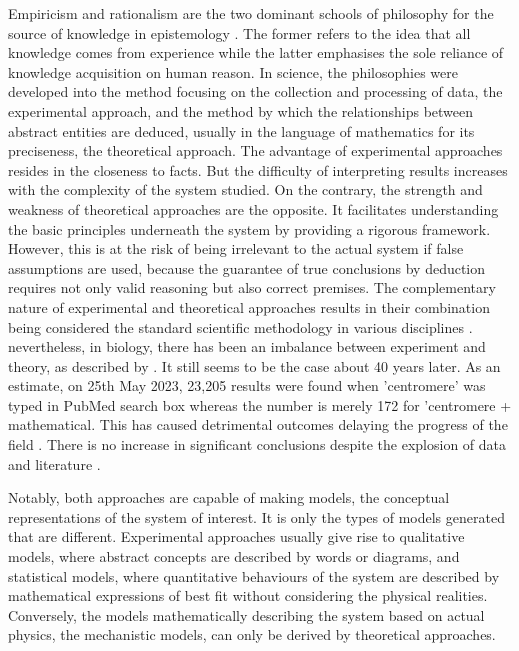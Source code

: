 Empiricism and rationalism are the two dominant schools of philosophy for the source of knowledge in epistemology \citep{Solomon2006ThePhilosophy}. The former refers to the idea that all knowledge comes from experience while the latter emphasises the sole reliance of knowledge acquisition on human reason. In science, the philosophies were developed into the method focusing on the collection and processing of data, the experimental approach, and the method by which the relationships between abstract entities are deduced, usually in the language of mathematics for its preciseness, the theoretical approach. The advantage of experimental approaches resides in the closeness to facts. But the difficulty of interpreting results increases with the complexity of the system studied. On the contrary, the strength and weakness of theoretical approaches are the opposite. It facilitates understanding the basic principles underneath the system by providing a rigorous framework. However, this is at the risk of being irrelevant to the actual system if false assumptions are used, because the guarantee of true conclusions by deduction requires not only valid reasoning but also correct premises. The complementary nature of experimental and theoretical approaches results in their combination being considered the standard scientific methodology in various disciplines \citep{Platt1964StrongInference}. nevertheless, in biology, there has been an imbalance between experiment and theory, as described by  \cite{Fidelman1985TheModeling}. It still seems to be the case about 40 years later. As an estimate, on 25th May 2023, 23,205 results were found when 'centromere' was typed in PubMed search box whereas the number is merely 172 for 'centromere + mathematical. This has caused detrimental outcomes delaying the progress of the field \citep{Fidelman1985TheModeling}. There is no increase in significant conclusions despite the explosion of data and literature \citep{Park2023PapersTime, Nurse2021BiologyData}. 

Notably, both approaches are capable of making models, the conceptual representations of the system of interest. It is only the types of models generated that are different. Experimental approaches usually give rise to qualitative models, where abstract concepts are described by words or diagrams, and statistical models, where quantitative behaviours of the system are described by mathematical expressions of best fit without considering the physical realities. Conversely, the models mathematically describing the system based on actual physics, the mechanistic models, can only be derived by theoretical approaches. 


